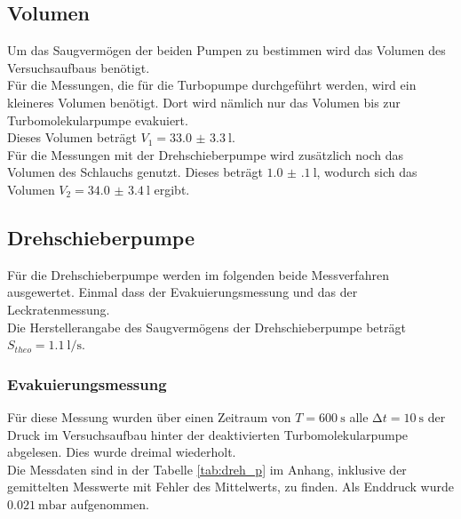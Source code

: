       \subsection{Volumen}
        Um das Saugvermögen der beiden Pumpen zu bestimmen wird das Volumen des Versuchsaufbaus benötigt.\\
        Für die Messungen, die für die Turbopumpe durchgeführt werden, wird ein kleineres Volumen benötigt.
        Dort wird nämlich nur das Volumen bis zur Turbomolekularpumpe evakuiert.\\
        Dieses Volumen beträgt $V_1 = \SI{33.0(33)}{\litre}$.\\
        Für die Messungen mit der Drehschieberpumpe wird zusätzlich noch das Volumen des Schlauchs genutzt. 
        Dieses beträgt $\SI{1.0(1)}{\litre}$, wodurch sich das Volumen $V_2 = \SI{34.0(34)}{\litre}$ ergibt.\\



      \subsection{Drehschieberpumpe}

        \noindent Für die Drehschieberpumpe werden im folgenden beide Messverfahren ausgewertet. Einmal dass der Evakuierungsmessung und das der Leckratenmessung.\\
        Die Herstellerangabe des Saugvermögens der Drehschieberpumpe beträgt $ S_{theo} = \SI{1.1}{\litre\per\second}$.

        \subsubsection{Evakuierungsmessung}

        \noindent Für diese Messung wurden über einen Zeitraum von $ T = \SI{600}{\second}$ alle $ \increment t = \SI{10}{\second}$
        der Druck im Versuchsaufbau hinter der deaktivierten Turbomolekularpumpe abgelesen. Dies wurde dreimal wiederholt.\\
        Die Messdaten sind in der Tabelle \ref{tab:dreh_p} im Anhang, inklusive der gemittelten Messwerte mit Fehler des Mittelwerts, zu finden.
        Als Enddruck wurde $\SI{0.021}{\milli\bar}$ aufgenommen.\\\\
        
